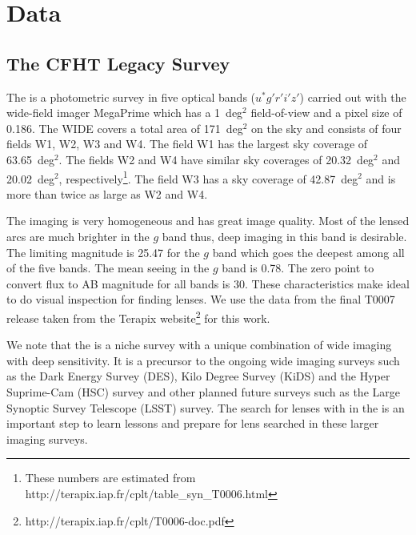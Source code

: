 \documentclass[useAMS,usenatbib,a4paper]{mn2e}
\begin{document}

\section{Data}
\label{sec:data}
\subsection{The CFHT Legacy Survey}
\label{sec:data:cfhtls}

The \cfhtls is a photometric survey in five optical bands
($u^*g'r'i'z'$) carried out with the wide-field imager MegaPrime which
has a 1~deg$^2$ field-of-view and a pixel size of 0.186\arcsec. The
\cfhtls \textsc{WIDE} covers a total area of 171~deg$^2$ on the sky and
consists of four fields W1, W2, W3 and W4. The field W1 has the
largest sky coverage of 63.65~deg$^2$. The fields W2 and W4 have similar
sky coverages of 20.32~deg$^2$ and 20.02~deg$^2$,
respectively\footnote{These numbers are estimated from
http://terapix.iap.fr/cplt/table\_syn\_T0006.html}.  The field W3 has a
sky coverage of 42.87~deg$^2$ and is more than twice as large as W2 and
W4.

The \cfhtls imaging is very homogeneous and has great image quality. Most of
the lensed arcs are much brighter in the $g$ band thus, deep imaging in
this band is desirable. The limiting magnitude is 25.47 for the $g$ band
which goes the deepest among all of the five bands. The mean seeing in
the $g$ band is 0.78\arcsec. The zero point to convert flux to AB
magnitude for all bands is 30. These characteristics make \cfhtls ideal
to do visual inspection for finding lenses.  We use the data from the
final T0007 release taken from the Terapix
website\footnote{{http://terapix.iap.fr/cplt/T0006-doc.pdf}}
for this work.

We note that the \cfhtls is a niche survey with a unique combination of wide
imaging with deep sensitivity. It is a precursor to the ongoing wide imaging
surveys such as the Dark Energy Survey (DES), Kilo Degree Survey (KiDS) and the
Hyper Suprime-Cam (HSC) survey and other planned future surveys such as the
Large Synoptic Survey Telescope (LSST) survey.  The search for lenses with \sw
in the \cfhtls is an important step to learn lessons and prepare for lens
searched in these larger imaging surveys.


\end{document}
